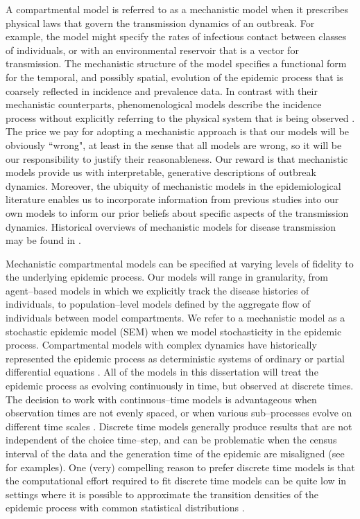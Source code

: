 A compartmental model is referred to as a mechanistic model when it prescribes physical laws that govern the transmission dynamics of an outbreak. For example, the model might specify the rates of infectious contact between classes of individuals, or with an environmental reservoir that is a vector for transmission. The mechanistic structure of the model specifies a functional form for the temporal, and possibly spatial, evolution of the epidemic process that is coarsely reflected in incidence and prevalence data. In contrast with their mechanistic counterparts, phenomenological models describe the incidence process without explicitly referring to the physical system that is being observed \cite{chowell2017fitting,chowell2016review}. The price we pay for adopting a mechanistic approach is that our models will be obviously ``wrong", at least in the sense that all models are wrong, so it will be our responsibility to justify their reasonableness. Our reward is that mechanistic models provide us with interpretable, generative descriptions of outbreak dynamics. Moreover, the ubiquity of mechanistic models in the epidemiological literature enables us to incorporate information from previous studies into our own models to inform our prior beliefs about specific aspects of the transmission dynamics. Historical overviews of mechanistic models for disease transmission may be found in \cite{anderson1992infectious,brauer2017mathematical,keeling2008,lessler2016mechanistic}.

Mechanistic compartmental models can be specified at varying levels of fidelity to the underlying epidemic process. Our models will range in granularity, from agent--based models in which we explicitly track the disease histories of individuals, to population--level models defined by the aggregate flow of individuals between model compartments. We refer to a mechanistic model as a stochastic epidemic model (SEM) when we model stochasticity in the epidemic process. Compartmental models with complex dynamics have historically represented the epidemic process as deterministic systems of ordinary or partial differential equations \cite{keeling2008}. All of the models in this dissertation will treat the epidemic process as evolving continuously in time, but observed at discrete times. The decision to work with continuous--time models is advantageous when observation times are not evenly spaced, or when various sub--processes evolve on different time scales \cite{glass2003,shelton2014}. Discrete time models generally produce results that are not independent of the choice time--step, and can be problematic when the census interval of the data and the generation time of the epidemic are misaligned (see \cite{shelton2014} for examples). One (very) compelling reason to prefer discrete time models is that the computational effort required to fit discrete time models can be quite low in settings where it is possible to approximate the transition densities of the epidemic process with common statistical distributions \cite{fisher2017time,held2005}. 

